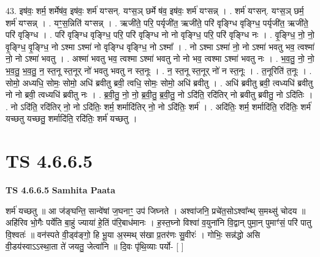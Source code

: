 \documentclass[17pt]{extarticle}
\begin{document}
43. इष॑वः॒ शर्म॒ शर्मेष॑व॒ इष॑वः॒ शर्म॑ यꣳसन्. यꣳस॒ञ् छर्मे ष॑व॒ इष॑वः॒ शर्म॑ यꣳसन्न् । . शर्म॑ यꣳसन्. यꣳस॒ञ् छर्म॒ शर्म॑ यꣳसन्न् । . यꣳ॒॒स॒न्निति॑ यꣳसन्न् । . ऋजी॑ते॒ परि॒ पर्यृजी॑त॒ ऋजी॑ते॒ परि॑ वृङ्ग्धि वृङ्ग्धि॒ पर्यृजी॑त॒ ऋजी॑ते॒ परि॑ वृङ्ग्धि । . परि॑ वृङ्ग्धि वृङ्ग्धि॒ परि॒ परि॑ वृङ्ग्धि नो नो वृङ्ग्धि॒ परि॒ परि॑ वृङ्ग्धि नः । . वृ॒ङ्ग्धि॒ नो॒ नो॒ वृ॒ङ्ग्धि॒ वृ॒ङ्ग्धि॒ नो ऽश्मा ऽश्मा॑ नो वृङ्ग्धि वृङ्ग्धि॒ नो ऽश्मा᳚ । . नो ऽश्मा ऽश्मा॑ नो॒ नो ऽश्मा॑ भवतु भव॒ त्वश्मा॑ नो॒ नो ऽश्मा॑ भवतु । . अश्मा॑ भवतु भव॒ त्वश्मा ऽश्मा॑ भवतु नो नो भव॒ त्वश्मा ऽश्मा॑ भवतु नः । . भ॒व॒तु॒ नो॒ नो॒ भ॒व॒तु॒ भ॒व॒तु॒ न॒ स्त॒नू स्त॒नूर् नो॑ भवतु भवतु न स्त॒नूः । . न॒ स्त॒नू स्त॒नूर् नो॑ न स्त॒नूः । . त॒नूरिति॑ त॒नूः । . सोमो॒ अध्यधि॒ सोमः॒ सोमो॒ अधि॑ ब्रवीतु ब्रवी॒ त्वधि॒ सोमः॒ सोमो॒ अधि॑ ब्रवीतु । . अधि॑ ब्रवीतु ब्रवी॒ त्वध्यधि॑ ब्रवीतु नो नो ब्रवी॒ त्वध्यधि॑ ब्रवीतु नः । . ब्र॒वी॒तु॒ नो॒ नो॒ ब्र॒वी॒तु॒ ब्र॒वी॒तु॒ नो ऽदि॑ति॒ रदि॑तिर् नो ब्रवीतु ब्रवीतु॒ नो ऽदि॑तिः । . नो ऽदि॑ति॒ रदि॑तिर् नो॒ नो ऽदि॑तिः॒ शर्म॒ शर्मादि॑तिर् नो॒ नो ऽदि॑तिः॒ शर्म॑ । . अदि॑तिः॒ शर्म॒ शर्मादि॑ति॒ रदि॑तिः॒ शर्म॑ यच्छतु यच्छतु॒ शर्मादि॑ति॒ रदि॑तिः॒ शर्म॑ यच्छतु । \newline
\pagebreak
{}

\section{ TS 4.6.6.5 }

\textbf{TS 4.6.6.5 } \newline
\textbf{Samhita Paata} \newline

शर्म॑ यच्छतु ॥ आ ज॑ङ्घन्ति॒ सान्वे॑षां ज॒घनाꣳ॒॒ उप॑ जिघ्नते । अश्वा॑जनि॒ प्रचे॑त॒सोऽश्वा᳚न्थ् स॒मथ्सु॑ चोदय ॥ अहि॑रिव भो॒गैः पर्ये॑ति बा॒हुं ज्याया॑ हे॒तिं प॑रि॒बाध॑मानः । ह॒स्त॒घ्नो विश्वा॑ व॒युना॑नि वि॒द्वान् पुमा॒न् पुमाꣳ॑सं॒ परि॑ पातु वि॒श्वतः॑ ॥ वन॑स्पते वी॒ड्व॑ङ्गो॒ हि भू॒या अ॒स्मथ् स॑खा प्र॒तर॑णः सु॒वीरः॑ । गोभिः॒ सन्न॑द्धो असि वी॒डय॑स्वाऽऽस्था॒ता ते॑ जयतु॒ जेत्वा॑नि ॥ दि॒वः पृ॑थि॒व्याः पर्यो- [  ] \newline
\end{document}
